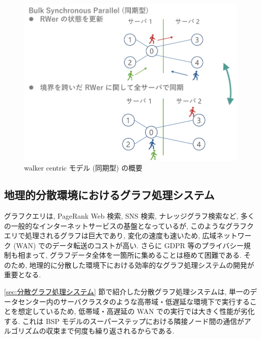 \begin{figure}[t]
    \centering
    \includegraphics[scale=0.7]{figure/walkercentric.pdf}
    \caption{walker centric モデル (同期型) の概要}
    \label{walker centric モデル (同期型) の概要}
\end{figure}

\subsection{地理的分散環境におけるグラフ処理システム}

グラフクエリは, PageRank Web 検索\cite{334}, SNS 検索\cite{10.5555/2535461.2535468}, ナレッジグラフ検索\cite{10.1145/3331184.3331252}など, 多くの一般的なインターネットサービスの基盤となっているが, このようなグラフクエリで処理されるグラフは巨大であり, 変化の速度も速い\cite{10.1145/2723372.2735365}ため, 広域ネットワーク (WAN) でのデータ転送のコストが高い. さらに GDPR 等のプライバシー規制も相まって, グラフデータ全体を一箇所に集めることは極めて困難である. そのため, 地理的に分散した環境下における効率的なグラフ処理システムの開発が重要となる. 

\ref{sec:分散グラフ処理システム} 節で紹介した分散グラフ処理システムは, 単一のデータセンター内のサーバクラスタのような高帯域・低遅延な環境下で実行することを想定しているため, 低帯域・高遅延の WAN での実行では大きく性能が劣化する. これは BSP モデルのスーパーステップにおける隣接ノード間の通信がアルゴリズムの収束まで何度も繰り返されるからである. 

